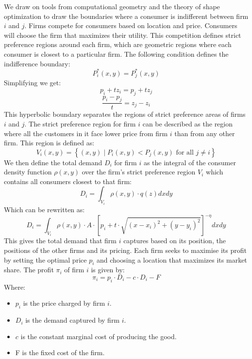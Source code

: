 We draw on tools from computational geometry and the theory of shape optimization to draw the boundaries where a consumer is indifferent between firm $i$ and $j$.
Firms compete for consumers based on location and price. Consumers will choose the firm that maximizes their utility. This competition defines strict preference regions around each firm, which are geometric regions where each consumer is closest to a particular firm.
The following condition defines the indifference boundary:
\begin{equation}
P^*_i(x, y)=P^*_j(x, y)
\end{equation}
Simplifying we get:
\begin{equation}
    p_i+tz_i=p_j+tz_j
\end{equation}
\begin{equation}
    \frac{p_i-p_j}{t}=z_j-z_i
    \label{eq:voronoi}
\end{equation}
This hyperbolic boundary separates the regions of strict preference areas of firms $i$ and $j$.
The strict preference region for firm $i$ can be described as the region where all the customers in it face lower price from firm $i$ than from any other firm. This region is defined as:
\begin{equation}
V_i(x, y)=\left\{(x, y) \mid P_i(x, y)<P_j(x, y) \text { for all } j \neq i\right\}
\end{equation}
We then define the total demand $D_i$ for firm $i$ as the integral of the consumer density function $\rho(x,y)$ over the firm's strict preference region $V_i$ which contains all consumers closest to that firm:
\begin{equation}
D_i=\int_{V_i} \rho(x, y) \cdot q(z) d x d y
\label{eq:demand}
\end{equation}
Which can be rewritten as:
\begin{equation}
D_i=\int_{V_i} \rho(x, y) \cdot A \cdot\left[p_i+t \cdot \sqrt{\left(x-x_i\right)^2+\left(y-y_i\right)^2}\right]^{-\eta} d x d y
\end{equation}
This gives the total demand that firm $i$ captures based on its position, the positions of the other firms and its pricing.
Each firm seeks to maximise its profit by setting the optimal price $p_i$ and choosing a location that maximizes its market share.
The profit $\pi_i$ of firm $i$ is given by:
\begin{equation}
    \pi_i=p_i\cdot D_i- c\cdot D_i -F
\end{equation}
Where:
\begin{itemize}
    \item $p_i$ is the price charged by firm $i$.
    \item $D_i$ is the demand captured by firm $i$.
    \item $c$ is the constant marginal cost of producing the good.
    \item F is the fixed cost of the firm.
\end{itemize}

